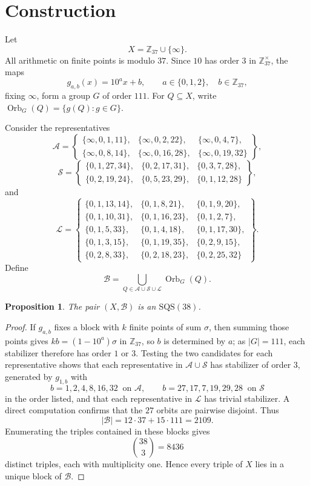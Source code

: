 \documentclass[11pt]{amsart}
\newtheorem{proposition}[theorem]{Proposition}
\newcommand{\Z}{\mathbb Z}
\newcommand{\SQS}{\mathrm{SQS}}
\newcommand{\Orb}{\operatorname{Orb}}
\begin{document}
\section{Construction}

Let
\[
X=\Z_{37}\cup\{\infty\}.
\]
All arithmetic on finite points is modulo $37$. Since $10$ has order
$3$ in $\Z_{37}^{\times}$, the maps
\[
g_{a,b}(x)=10^a x+b,
\qquad a\in\{0,1,2\},\quad b\in\Z_{37},
\]
fixing $\infty$, form a group $G$ of order $111$. For $Q\subseteq X$,
write $\Orb_G(Q)=\{g(Q):g\in G\}$.

Consider the representatives
\[
\mathcal A=\left\{
\begin{array}{lll}
\{\infty,0,1,11\},&
\{\infty,0,2,22\},&
\{\infty,0,4,7\},\\
\{\infty,0,8,14\},&
\{\infty,0,16,28\},&
\{\infty,0,19,32\}
\end{array}
\right\},
\]
\[
\mathcal S=\left\{
\begin{array}{lll}
\{0,1,27,34\},&
\{0,2,17,31\},&
\{0,3,7,28\},\\
\{0,2,19,24\},&
\{0,5,23,29\},&
\{0,1,12,28\}
\end{array}
\right\},
\]
and
\[
\mathcal L=\left\{
\begin{array}{lll}
\{0,1,13,14\},&
\{0,1,8,21\},&
\{0,1,9,20\},\\
\{0,1,10,31\},&
\{0,1,16,23\},&
\{0,1,2,7\},\\
\{0,1,5,33\},&
\{0,1,4,18\},&
\{0,1,17,30\},\\
\{0,1,3,15\},&
\{0,1,19,35\},&
\{0,2,9,15\},\\
\{0,2,8,33\},&
\{0,2,18,23\},&
\{0,2,25,32\}
\end{array}
\right\}.
\]
Define
\[
\mathcal B=
\bigcup_{Q\in\mathcal A\cup\mathcal S\cup\mathcal L}\Orb_G(Q).
\]

\begin{proposition}\label{prop:sqs}
The pair $(X,\mathcal B)$ is an $\SQS(38)$.
\end{proposition}

\begin{proof}
If $g_{a,b}$ fixes a block with $k$ finite points of sum $\sigma$,
then summing those points gives $kb=(1-10^{a})\sigma$ in $\Z_{37}$, so
$b$ is determined by $a$; as $|G|=111$, each stabilizer therefore has
order $1$ or $3$. Testing the two candidates for each representative shows that
each representative in $\mathcal A\cup\mathcal S$ has stabilizer of
order $3$, generated by $g_{1,b}$ with
\[
b=1,2,4,8,16,32\ \text{ on }\mathcal A,
\qquad
b=27,17,7,19,29,28\ \text{ on }\mathcal S
\]
in the order listed, and that each representative in $\mathcal L$ has
trivial stabilizer. A direct computation confirms that the $27$ orbits
are pairwise disjoint. Thus
\[
|\mathcal B|=12\cdot37+15\cdot111=2109.
\]
Enumerating the triples contained in these blocks gives
\[
\binom{38}{3}=8436
\]
distinct triples, each with multiplicity one. Hence every triple of
$X$ lies in a unique block of $\mathcal B$.
\end{proof}
\end{document}
